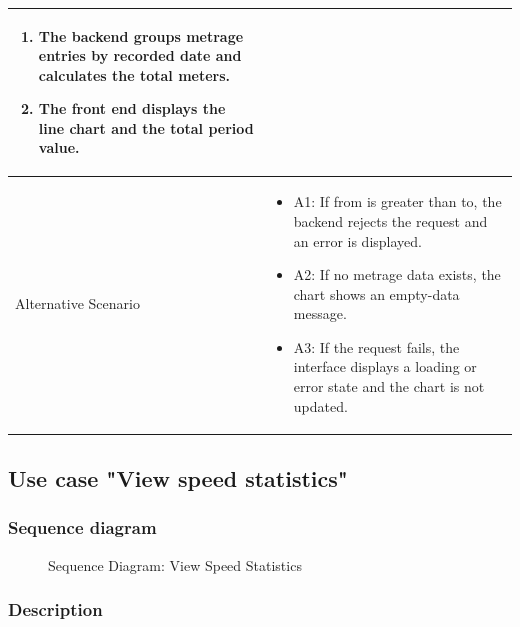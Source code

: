 {\begin{longtable}{|p{}|p{}|}
\begin{enumerate}
\item The backend groups metrage entries by recorded date and calculates the total meters.
\item The front end displays the line chart and the total period value.
\end{enumerate} \\ \hline
Alternative Scenario &
\begin{itemize}
\item A1: If from is greater than to, the backend rejects the request and an error is displayed.
\item A2: If no metrage data exists, the chart shows an empty-data message.
\item A3: If the request fails, the interface displays a loading or error state and the chart is not updated.
\end{itemize} \\ \hline
\end{longtable}
}

\subsection{Use case "View speed statistics"}

\subsubsection{Sequence diagram}

\begin{figure}[H]
\centering
{}
\caption{Sequence Diagram: View Speed Statistics}
\label{fig:chapter2-view-speed-statistics}
\end{figure}

\subsubsection{Description}

